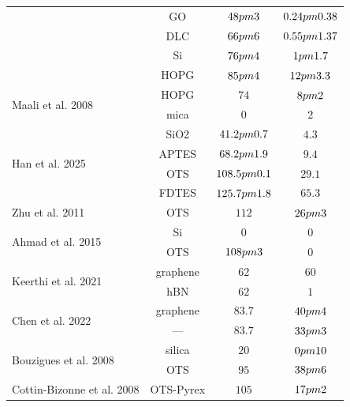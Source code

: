 \begin{table}
\begin{tabular}{lccc}
     & GO & $48 \\pm 3$ & $0.24 \\pm 0.38$ \\
     & DLC & $66 \\pm 6$ & $0.55 \\pm 1.37$ \\
     & Si & $76 \\pm 4$ & $1 \\pm 1.7$ \\
     & HOPG & $85 \\pm 4$ & $12 \\pm 3.3$ \\
    \multirow{2}{*}{Maali et al. 2008} & HOPG & $74$ & $8 \\pm 2$ \\
     & mica & $0$ & $2$ \\
    \multirow{4}{*}{Han et al. 2025} & SiO2 & $41.2 \\pm 0.7$ & $4.3$ \\
     & APTES & $68.2 \\pm 1.9$ & $9.4$ \\
     & OTS & $108.5 \\pm 0.1$ & $29.1$ \\
     & FDTES & $125.7 \\pm 1.8$ & $65.3$ \\
    \multirow{1}{*}{Zhu et al. 2011} & OTS & $112$ & $26 \\pm 3$ \\
    \multirow{2}{*}{Ahmad et al. 2015} & Si & $0$ & $0$ \\
     & OTS & $108 \\pm 3$ & $0$ \\
    \multirow{2}{*}{Keerthi et al. 2021} & graphene & $62$ & $60$ \\
     & hBN & $62$ & $1$ \\
    \multirow{2}{*}{Chen et al. 2022} & graphene & $83.7$ & $40 \\pm 4$ \\
     & --- & $83.7$ & $33 \\pm 3$ \\
    \multirow{2}{*}{Bouzigues et al. 2008} & silica & $20$ & $0 \\pm 10$ \\
     & OTS & $95$ & $38 \\pm 6$ \\
    \multirow{3}{*}{Cottin-Bizonne et al. 2008} & OTS-Pyrex & $105$ & $17 \\pm 2$ \\

\end{tabular}
\end{table}
